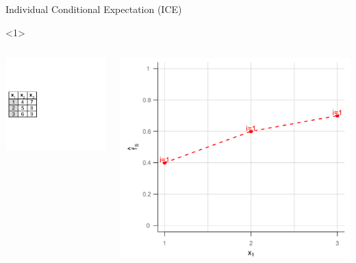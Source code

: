 \documentclass[11pt,compress,t,notes=noshow, xcolor=table]{beamer}
\begin{document}
\begin{vbframe}{Individual Conditional Expectation (ICE)}
\framebreak
\begin{onlyenv}<1>
  \vspace{1cm}
    \begin{columns}[T]
    \begin{column}{0.5\textwidth}
  \centering
  \includegraphics[page=5, width=\textwidth]{figure_man/ice_pd_plot_demo}
  \end{column}
 \begin{column}{0.5\textwidth}
  \vspace{0.3cm}

\begin{center}
\includegraphics[width=1\textwidth]{figure_man/ICE02.png}
\end{center}


\end{column}
\end{columns}
\end{onlyenv}
\end{vbframe}
\end{document}
